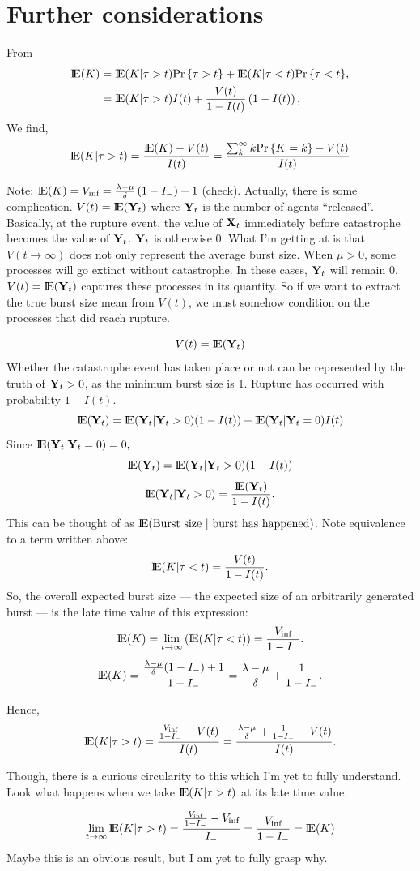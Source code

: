 \section{Further considerations}

From 
\begin{align}
{\rm I}\!{\rm E}(K) &= {\rm I}\!{\rm E}(K| \tau > t) {\text{Pr}\left\{\tau > t\right\}} + {\rm I}\!{\rm E}(K| \tau < t){\text{Pr}\left\{\tau<t\right\}},\\
&= {\rm I}\!{\rm E}(K|\tau > t) I(t) + \frac{V(t)}{1 - I(t)} \left(1 - I(t)\right),
\end{align}
We find,
$${\rm I}\!{\rm E}(K| \tau > t)  = \frac{{\rm I}\!{\rm E}(K) - V(t)}{I(t)}   =   \frac{  \sum^{\infty}_{k} k {\text{Pr}\left\{K = k\right\}}  - V(t)}{I(t)}$$

Note: ${\rm I}\!{\rm E}(K) = V_{\text{inf}} = \frac{\lambda - \mu}{\delta} \left(1 - I_-\right) + 1$ (check). Actually, there is some complication. $V(t) = {\rm I}\!{\rm E}({{\bf Y}_t})$ where ${{\bf Y}_t}$ is the number of agents ``released''. Basically, at the rupture event, the value of ${{\bf X}_t}$ immediately before catastrophe becomes the value of ${{\bf Y}_t}$. ${{\bf Y}_t}$ is otherwise 0. What I'm getting at is that $V(t\to \infty)$ does not only represent the average burst size. When $\mu > 0$, some processes will go extinct without catastrophe. In these cases, ${{\bf Y}_t}$ will remain 0. $V(t) = {\rm I}\!{\rm E}({{\bf Y}_t})$ captures these processes in its quantity. So if we want to extract the true burst size mean from $V(t)$, we must somehow condition on the processes that did reach rupture. 

$$V(t) = {\rm I}\!{\rm E}({{\bf Y}_t})$$ 
Whether the catastrophe event has taken place or not can be represented by the truth of ${{\bf Y}_t}>0$, as the minimum burst size is 1. Rupture has occurred with probability $1 - I(t)$.
$${\rm I}\!{\rm E}({{\bf Y}_t}) = {\rm I}\!{\rm E}({{\bf Y}_t}|{{\bf Y}_t} > 0)(1-I(t)) + {{\rm I}\!{\rm E}({{\bf Y}_t} | {{\bf Y}_t} = 0)}I(t)$$
Since $ {{\rm I}\!{\rm E}({{\bf Y}_t} | {{\bf Y}_t} = 0)} = 0,$
$${\rm I}\!{\rm E}({{\bf Y}_t}) = {\rm I}\!{\rm E}({{\bf Y}_t}|{{\bf Y}_t} > 0)(1-I(t))$$
$$ {\rm I}\!{\rm E}({{\bf Y}_t}|{{\bf Y}_t} > 0) = \frac{{\rm I}\!{\rm E}({{\bf Y}_t})}{1-I(t)}.$$
This can be thought of as ${\rm I}\!{\rm E}(\text{Burst size } | \text{ burst has happened})$. Note equivalence to a term written above:
$${\rm I}\!{\rm E}(K | \tau < t) =\frac{V(t)}{1-I(t)}. $$
So, the overall expected burst size --- the expected size of an arbitrarily generated burst --- is the late time value of this expression: 
$${\rm I}\!{\rm E}(K) = \lim_{t\to \infty} \left({\rm I}\!{\rm E}(K| \tau < t)\right) = \frac{V_{\text{inf}}}{1 - I_-}.$$
$${\rm I}\!{\rm E}(K) = \frac{\frac{\lambda - \mu}{\delta}(1-I_-) + 1}{1-I_-} = \frac{\lambda - \mu}{\delta} + \frac{1}{1-I_-}.$$

Hence, 
$${\rm I}\!{\rm E}(K|\tau > t) = \frac{\frac{V_{\text{inf}}}{1 - I_-} - V(t)}{I(t)} =  \frac{\frac{\lambda - \mu}{\delta} + \frac{1}{1-I_-} - V(t)}{I(t)}.$$

Though, there is a curious circularity to this which I'm yet to fully understand. Look what happens when we take ${\rm I}\!{\rm E}(K|\tau> t)$ at its late time value. 

$$\lim_{t\to\infty}{\rm I}\!{\rm E}(K|\tau > t) = \frac{\frac{V_{\text{inf}}}{1 - I_-} - V_{\text{inf}}}{I_-}  = \frac{V_{\text{inf}}}{1 - I_-} = {\rm I}\!{\rm E}(K)$$
Maybe this is an obvious result, but I am yet to fully grasp why.
